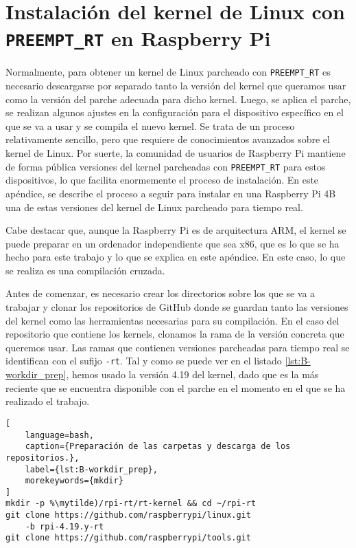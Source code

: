 \chapter{Instalación del kernel de Linux con \texttt{PREEMPT\_RT} en Raspberry Pi}
\label{app:B-rt_raspi}

Normalmente, para obtener un kernel de Linux parcheado con \texttt{PREEMPT\_RT}
es necesario descargarse por separado tanto la versión del kernel que queramos
usar como la versión del parche adecuada para dicho kernel. Luego, se aplica el
parche, se realizan algunos ajustes en la configuración para el dispositivo
específico en el que se va a usar y se compila el nuevo kernel. Se trata de un
proceso relativamente sencillo, pero que requiere de conocimientos avanzados
sobre el kernel de Linux. Por suerte, la comunidad de usuarios de Raspberry Pi
mantiene  de forma pública versiones del kernel parcheadas con
\texttt{PREEMPT\_RT} para estos dispositivos, lo que facilita enormemente el
proceso de instalación. En este apéndice, se describe el proceso a seguir para
instalar en una Raspberry Pi 4B una de estas versiones del kernel de Linux
parcheado para tiempo real.

Cabe destacar que, aunque la Raspberry Pi es de arquitectura ARM, el kernel se
puede preparar en un ordenador independiente que sea x86, que es lo que se ha
hecho para este trabajo y lo que se explica en este apéndice. En este caso, lo
que se realiza es una compilación cruzada.

Antes de comenzar, es necesario crear los directorios sobre los que se va a
trabajar y clonar los repositorios de GitHub donde se guardan tanto las
versiones del kernel como las herramientas necesarias para su compilación. En el
caso del repositorio que contiene los kernels, clonamos la rama de la versión
concreta que queremos usar. Las ramas que contienen versiones parcheadas para
tiempo real se identifican con el sufijo \texttt{-rt}. Tal y como se puede ver
en el listado \ref{lst:B-workdir_prep}, hemos usado la versión 4.19 del kernel,
dado que es la más reciente que se encuentra disponible con el parche en el
momento en el que se ha realizado el trabajo.

\begin{lstlisting}[
    language=bash,
    caption={Preparación de las carpetas y descarga de los repositorios.},
    label={lst:B-workdir_prep},
    morekeywords={mkdir}
]
mkdir -p %\mytilde)/rpi-rt/rt-kernel && cd ~/rpi-rt
git clone https://github.com/raspberrypi/linux.git 
    -b rpi-4.19.y-rt
git clone https://github.com/raspberrypi/tools.git
\end{lstlisting}


